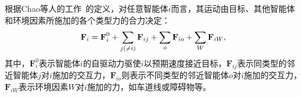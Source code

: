根据Chao等人的工作~\cite{chao2019force}的定义，对任意智能体$i$而言，其运动由目标、其他智能体和环境因素所施加的各个类型力的合力决定：
\begin{equation}
\setlength\abovedisplayskip{6pt}
\setlength\belowdisplayskip{6pt}
\label{eq:simplified_previous}
    \textbf{F}_i = \textbf{F}_i^0 + \sum_{j(\not=i)}\textbf{F}_{ij} + \sum_{o}\textbf{F}_{io} +  \sum_{W}\textbf{F}_{iW},
\end{equation}
其中，$\textbf{F}_i^0$表示智能体$i$的自驱动力驱使$i$以预期速度接近目标，$\textbf{F}_{ij}$表示同类型的邻近智能体$j$对$i$施加的交互力，$\textbf{F}_{io}$则表示不同类型的邻近智能体$o$对$i$施加的交互力，$\textbf{F}_{iW}$表示环境因素$W$对$i$施加的力，如车道线或障碍物等。


\begin{table}[!b]
\setlength{\belowcaptionskip}{0.4cm}
\centering
\caption[Chao等人方法使用的社会力模型的统计与分类]{
Chao等人方法~\cite{chao2019force}使用的社会力模型的统计与分类
}

\label{tab:simplified_decayfunc}
\renewcommand\arraystretch{1.5}
\end{table}



